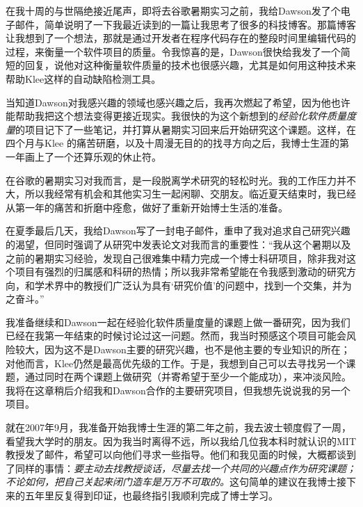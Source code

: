 \documentclass[letter,12pt]{book}
\begin{document}
\begin{CJK}{UTF8}{gbsn}
\breakline

在我十周的与世隔绝接近尾声，即将去谷歌暑期实习之前，我给Dawson发了个电子邮件，简单说明了一下我最近读到的一篇让我思考了很多的科技博客。那篇博客让我想到了一个想法，那就是通过开发者在程序代码存在的整段时间里编辑代码的过程，来衡量一个软件项目的质量。令我惊喜的是，Dawson很快给我发了一个简短的回复，说他对这种衡量软件质量的技术也很感兴趣，尤其是如何用这种技术来帮助Klee这样的自动缺陷检测工具。

当知道Dawson对我感兴趣的领域也感兴趣之后，我再次燃起了希望，因为他也许能帮助我把这个想法变得更接近现实。我很快的为这个新想到的\emph{经验化软件质量度量}的项目记下了一些笔记，并打算从暑期实习回来后开始研究这个课题。这样，在四个月与Klee 的痛苦研磨，以及十周漫无目的的找寻方向之后，我博士生涯的第一年画上了一个还算乐观的休止符。


在谷歌的暑期实习对我而言，是一段脱离学术研究的轻松时光。我的工作压力并不大，所以我经常有机会和其他实习生一起闲聊、交朋友。临近夏天结束时，我已经从第一年的痛苦和折磨中痊愈，做好了重新开始博士生活的准备。

在夏季最后几天，我给Dawson写了一封电子邮件，重申了我对追求自己研究兴趣的渴望，但同时强调了从研究中发表论文对我而言的重要性：“我从这个暑期以及之前的暑期实习经验，发现自己很难集中精力完成一个博士科研项目，除非我对这个项目有强烈的归属感和科研的热情；所以我非常希望能在令我感到激动的研究方向，和学术界中的教授们广泛认为具有‘研究价值’的问题中，找到一个交集，并为之奋斗。”

我准备继续和Dawson一起在经验化软件质量度量的课题上做一番研究，因为我们已经在我第一年结束的时候讨论过这一问题。然而，我当时预感这个项目可能会风险较大，因为这不是Dawson主要的研究兴趣，也不是他主要的专业知识的所在；对他而言，Klee仍然是最高优先级的工作。于是，我想到自己可以去寻找另一个课题，通过同时在两个课题上做研究（并寄希望于至少一个能成功），来冲淡风险。我将在这章稍后介绍我和Dawson合作的主要研究项目，但我想先说说我的另一个项目。

\breakline

就在2007年9月，我准备开始我博士生涯的第二年之前，我去波士顿度假了一周，看望我大学时的朋友。因为我当时离得不远，所以我给几位我本科时就认识的MIT教授发了邮件，希望可以向他们寻求一些指导。他们和我见面的时候，大概都谈到了同样的事情：\emph{要主动去找教授谈话，尽量去找一个共同的兴趣点作为研究课题；不论如何，把自己关起来闭门造车是万万不可取的。}这句简单的建议在我博士接下来的五年里反复得到印证，也最终指引我顺利完成了博士学习。


\end{CJK}
\end{document}
